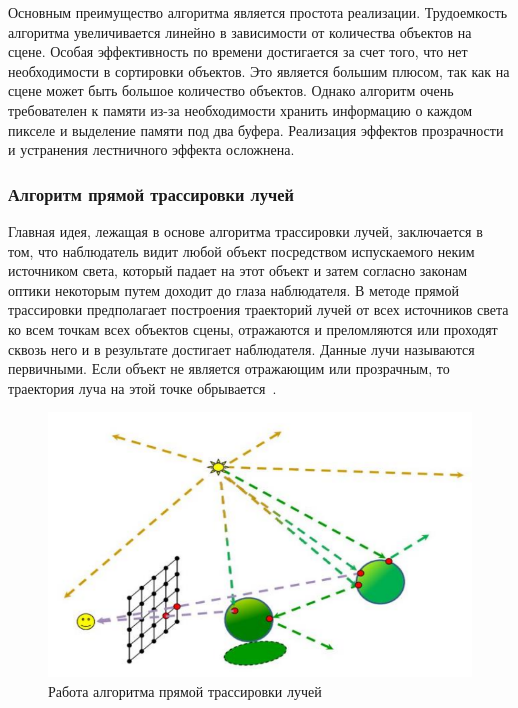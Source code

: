 Основным преимущество алгоритма является простота реализации.
Трудоемкость алгоритма увеличивается линейно в зависимости от количества объектов на сцене.
Особая эффективность по времени достигается за счет того, что нет необходимости в сортировки объектов. 
Это является большим плюсом, так как на сцене может быть большое количество объектов.
Однако алгоритм очень требователен к памяти из-за необходимости хранить информацию о каждом пикселе и выделение памяти под два буфера.
Реализация эффектов прозрачности и устранения лестничного эффекта осложнена.

\subsubsection{Алгоритм прямой трассировки лучей}

Главная идея, лежащая в основе алгоритма трассировки лучей, заключается в том, что наблюдатель видит любой объект посредством испускаемого неким источником света, который падает на этот объект и затем согласно законам оптики некоторым путем доходит до глаза наблюдателя. 
В методе прямой трассировки предполагает построения траекторий лучей от всех источников света ко всем точкам всех объектов сцены, отражаются и преломляются или проходят сквозь него и в результате достигает наблюдателя.
Данные лучи называются первичными.
Если объект не является отражающим или прозрачным, то траектория луча на этой точке обрывается~\cite{roders, ray-tracing}.

\begin{figure}[h]
	\centering
	\includegraphics[height=0.25\textheight]{img/direct-ray-tracing.png}
	\caption{Работа алгоритма прямой трассировки лучей}
	\label{img:ray-tracing}
\end{figure}

